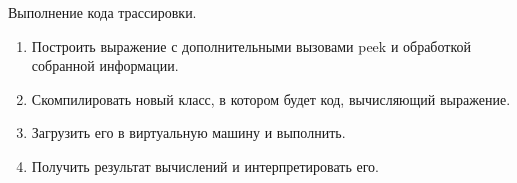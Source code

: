 \begin{frame}
\frametitle{\insertsection} 
\framesubtitle{\insertsubsection}
Выполнение кода трассировки.
\begin{enumerate}
	\item Построить выражение с дополнительными вызовами peek и обработкой собранной информации.
	\item Скомпилировать новый класс, в котором будет код, вычисляющий выражение.
	\item Загрузить его в виртуальную машину и выполнить.
	\item Получить результат вычислений и интерпретировать его.
\end{enumerate}
\end{frame}
